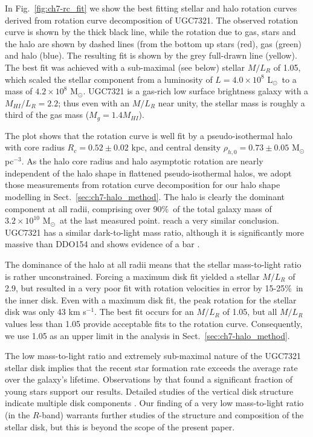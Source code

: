 \documentclass[traditabstract]{aa} %
\newcommand\kms{km s$^{-1}$}
\newcommand\msun{M$_{\odot }$}
\newcommand\msunpccube{M$_{\odot }$pc$^{-3}$}
\newcommand\lsun{L$_{\odot }$}
\begin{document}
In Fig.~\ref{fig:ch7-rc_fit} we show the best fitting stellar
and halo rotation curves derived from rotation curve decomposition of
UGC7321.  The observed rotation curve is shown by the thick black line, 
while the rotation due to gas, stars and the halo are shown by dashed 
lines (from the bottom up stars (red), gas (green) and halo (blue). 
The resulting fit is shown by the grey full-drawn line (yellow). The best fit
was achieved with a sub-maximal (see below) stellar $M/L_R$ of 1.05, which
scaled the stellar component from a luminosity of $L=4.0\times10^{8}$
\lsun\ to a mass of $4.2\times10^8$ \msun. UGC7321 is a gas-rich low
surface brightness galaxy with a $M_{HI}/L_R=2.2$; thus even with an
$M/L_R$ near unity, the stellar mass is roughly a third of the gas mass
($M_g = 1.4 M_{HI}$). 


 The plot shows that the rotation curve is well
fit by a pseudo-isothermal halo with core radius $R_c=0.52\pm0.02$
kpc, and central density $\rho_{h,0}=0.73\pm0.05$ \msunpccube. 
As the halo core radius and halo asymptotic rotation are nearly
independent of the halo shape in flattened pseudo-isothermal halos, we
adopt those measurements from rotation curve decomposition
for our halo shape modelling in Sect.~\ref{sec:ch7-halo_method}. The
halo is clearly the dominant component at all radii, comprising over
90\%\ of the total galaxy mass of $3.2\times10^{10}$ \msun\ at the
last measured point. \citet{um2003} reach a very similar conclusion. 
UGC7321 has a similar dark-to-light mass ratio, although it is 
significantly more massive than DDO154 and shows evidence of a bar
\citep{cf1988}.

The dominance of the halo at all radii means that the stellar
mass-to-light ratio is rather unconstrained.  Forcing a maximum
disk fit yielded a stellar $M/L_R$ of 2.9, but resulted in a very
poor fit with rotation velocities in error by 15-25\%\ in the inner disk. Even with
 a maximum disk fit, the peak rotation for the stellar disk was only 43
\kms. The best fit occurs for an
$M/L_R$ of 1.05, but all $M/L_R$ values less than 1.05 provide acceptable 
fits to the rotation curve. Consequently, we use 1.05 as an upper limit in 
the analysis in Sect.~\ref{sec:ch7-halo_method}. 

The low mass-to-light ratio and extremely sub-maximal nature of the UGC7321
stellar disk implies that the recent star formation rate exceeds the average 
rate over the galaxy's lifetime. Observations by \citet{mgvd1999} that found a 
significant fraction of young stars support our results. Detailed
studies of the vertical disk structure indicate multiple disk components \citep{mat2000}.
Our finding of a very low mass-to-light ratio 
(in the $R$-band) warrants further studies of the structure
and composition of the stellar disk, but this is beyond the scope of the 
present paper.
\end{document}

